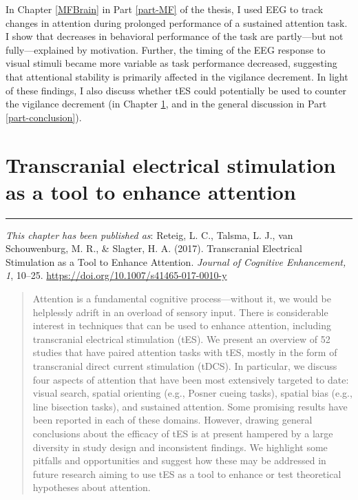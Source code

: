 \documentclass[11pt,english,]{memoir}
\begin{document}
In Chapter \ref{MFBrain} in Part \ref{part-MF} of the thesis, I used EEG to track changes in attention during prolonged performance of a sustained attention task. I show that decreases in behavioral performance of the task are partly---but not fully---explained by motivation. Further, the timing of the EEG response to visual stimuli became more variable as task performance decreased, suggesting that attentional stability is primarily affected in the vigilance decrement. In light of these findings, I also discuss whether tES could potentially be used to counter the vigilance decrement (in Chapter \ref{tDCS-att-review}, and in the general discussion in Part \ref{part-conclusion}).

\hypertarget{tDCS-att-review}{%
\chapter{Transcranial electrical stimulation as a tool to enhance attention}\label{tDCS-att-review}}


\vspace*{\fill}

\begin{center}\rule{0.5\linewidth}{\linethickness}\end{center}

\small

\noindent
\emph{This chapter has been published as}: Reteig, L. C., Talsma, L. J., van Schouwenburg, M. R., \& Slagter, H. A. (2017). Transcranial Electrical Stimulation as a Tool to Enhance Attention. \emph{Journal of Cognitive Enhancement, 1}, 10--25. \url{https://doi.org/10.1007/s41465-017-0010-y}
\newpage
\normalsize

\begin{abstract}
Attention is a fundamental cognitive process---without it, we would be helplessly adrift in an overload of sensory input. There is considerable interest in techniques that can be used to enhance attention, including transcranial electrical stimulation (tES). We present an overview of 52 studies that have paired attention tasks with tES, mostly in the form of transcranial direct current stimulation (tDCS). In particular, we discuss four aspects of attention that have been most extensively targeted to date: visual search, spatial orienting (e.g., Posner cueing tasks), spatial bias (e.g., line bisection tasks), and sustained attention. Some promising results have been reported in each of these domains. However, drawing general conclusions about the efficacy of tES is at present hampered by a large diversity in study design and inconsistent findings. We highlight some pitfalls and opportunities and suggest how these may be addressed in future research aiming to use tES as a tool to enhance or test theoretical hypotheses about attention.
\end{abstract} \newpage
\end{document}
